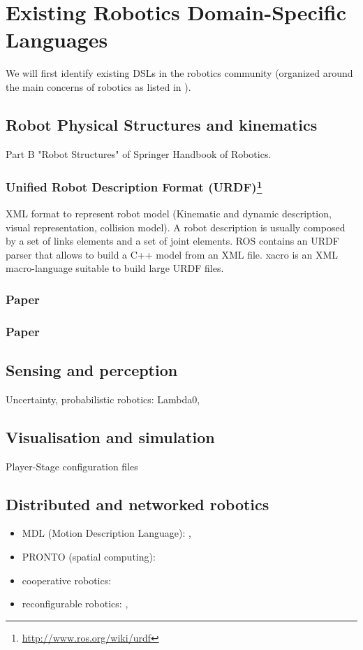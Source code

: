 \documentclass[jou]{apa}
\begin{document}
\section{Existing Robotics Domain-Specific Languages} %
\label{sec:Existing_Robotics_Domain-Specific_Languages}
We will first identify existing DSLs in the robotics community (organized around the main concerns of robotics as listed in \cite{SpringerHandbook:2008fk}).
\subsection{Robot Physical Structures and kinematics}
Part B "Robot Structures" of Springer Handbook of Robotics.

\subsubsection{Unified Robot Description Format (URDF)\footnote{\url{http://www.ros.org/wiki/urdf}}}
XML format to represent robot model (Kinematic and dynamic description, visual representation, collision model).
A robot description is usually composed by a set of links elements and a set of joint elements.
ROS contains an URDF parser that allows to build a C++ model from an XML file.
xacro is an XML macro-language suitable to build large URDF files.

\subsubsection{Paper\cite{Brugali:2007uq}}
\subsubsection{Paper\cite{Frigerio:2011fk}}


\subsection{Sensing and perception}
Uncertainty, probabilistic robotics: Lambda0, \cite{Thrun:2000}
\subsection{Visualisation and simulation}
Player-Stage configuration files\cite{Collett:2005bq}
\subsection{Distributed and networked robotics}
\begin{itemize}
\item MDL (Motion Description Language): \cite{Martin:2008vn}, \cite{Martin:2010uq}
\item PRONTO (spatial computing): \cite{Bachrach:2008bs}
\item cooperative robotics: \cite{Welborn:2005dg}
\item reconfigurable robotics: \cite{Schultz:2007le}, \cite{Schultz:2008vl}
\end{itemize}
\end{document}
